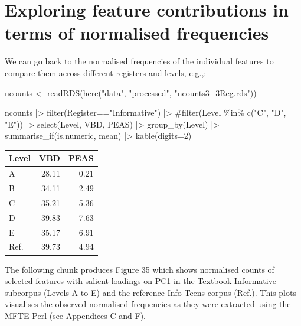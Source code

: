 \documentclass[
  letterpaper,
  DIV=11,
  numbers=noendperiod]{scrreprt}
\newenvironment{Shaded}{\begin{snugshade}}{\end{snugshade}}
\newcommand{\AttributeTok}[1]{\textcolor[rgb]{0.40,0.45,0.13}{#1}}
\newcommand{\CommentTok}[1]{\textcolor[rgb]{0.37,0.37,0.37}{#1}}
\newcommand{\DecValTok}[1]{\textcolor[rgb]{0.68,0.00,0.00}{#1}}
\newcommand{\FunctionTok}[1]{\textcolor[rgb]{0.28,0.35,0.67}{#1}}
\newcommand{\NormalTok}[1]{\textcolor[rgb]{0.00,0.23,0.31}{#1}}
\newcommand{\OtherTok}[1]{\textcolor[rgb]{0.00,0.23,0.31}{#1}}
\newcommand{\SpecialCharTok}[1]{\textcolor[rgb]{0.37,0.37,0.37}{#1}}
\newcommand{\StringTok}[1]{\textcolor[rgb]{0.13,0.47,0.30}{#1}}
\begin{document}
\section{Exploring feature contributions in terms of normalised
frequencies}\label{exploring-feature-contributions-in-terms-of-normalised-frequencies}

We can go back to the normalised frequencies of the individual features
to compare them across different registers and levels, e.g.,:

\begin{Shaded}
\begin{Highlighting}[]
\NormalTok{ncounts }\OtherTok{\textless{}{-}} \FunctionTok{readRDS}\NormalTok{(}\FunctionTok{here}\NormalTok{(}\StringTok{"data"}\NormalTok{, }\StringTok{"processed"}\NormalTok{, }\StringTok{"ncounts3\_3Reg.rds"}\NormalTok{))}

\NormalTok{ncounts }\SpecialCharTok{|\textgreater{}} 
  \FunctionTok{filter}\NormalTok{(Register}\SpecialCharTok{==}\StringTok{"Informative"}\NormalTok{) }\SpecialCharTok{|\textgreater{}} 
  \CommentTok{\#filter(Level \%in\% c("C", "D", "E")) |\textgreater{} }
  \FunctionTok{select}\NormalTok{(Level, VBD, PEAS) }\SpecialCharTok{|\textgreater{}} 
  \FunctionTok{group\_by}\NormalTok{(Level) }\SpecialCharTok{|\textgreater{}} 
  \FunctionTok{summarise\_if}\NormalTok{(is.numeric, mean) }\SpecialCharTok{|\textgreater{}} 
  \FunctionTok{kable}\NormalTok{(}\AttributeTok{digits=}\DecValTok{2}\NormalTok{)}
\end{Highlighting}
\end{Shaded}

\begin{longtable}[]{@{}lrr@{}}
\toprule\noalign{}
Level & VBD & PEAS \\
\midrule\noalign{}
\endhead
\bottomrule\noalign{}
\endlastfoot
A & 28.11 & 0.21 \\
B & 34.11 & 2.49 \\
C & 35.21 & 5.36 \\
D & 39.83 & 7.63 \\
E & 35.17 & 6.91 \\
Ref. & 39.73 & 4.94 \\
\end{longtable}

The following chunk produces Figure 35 which shows normalised counts of
selected features with salient loadings on PC1 in the Textbook
Informative subcorpus (Levels A to E) and the reference Info Teens
corpus (Ref.). This plots visualises the observed normalised frequencies
as they were extracted using the MFTE Perl (see Appendices C and F).
\end{document}
